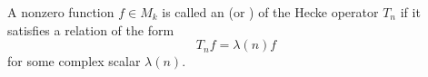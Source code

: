 A nonzero function $f \in M_k$ is called an  (or ) of the Hecke operator $T_n$ if it satisfies a relation of the form
$$T_n f = \lambda(n) f$$
for some complex scalar $\lambda(n)$.

